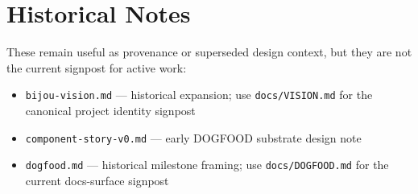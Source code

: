 \section{Historical Notes}\label{record-030-historical-notes}

These remain useful as provenance or superseded design context, but they are not the current signpost for active work:

\begin{itemize}
\tightlist
\item
  \texttt{b\allowbreak{}i\allowbreak{}j\allowbreak{}o\allowbreak{}u\allowbreak{}-\allowbreak{}v\allowbreak{}i\allowbreak{}s\allowbreak{}i\allowbreak{}o\allowbreak{}n\allowbreak{}.\allowbreak{}m\allowbreak{}d} --- historical expansion; use \texttt{d\allowbreak{}o\allowbreak{}c\allowbreak{}s\allowbreak{}/\allowbreak{}V\allowbreak{}I\allowbreak{}S\allowbreak{}I\allowbreak{}O\allowbreak{}N\allowbreak{}.\allowbreak{}m\allowbreak{}d} for the canonical project identity signpost
\item
  \texttt{c\allowbreak{}o\allowbreak{}m\allowbreak{}p\allowbreak{}o\allowbreak{}n\allowbreak{}e\allowbreak{}n\allowbreak{}t\allowbreak{}-\allowbreak{}s\allowbreak{}t\allowbreak{}o\allowbreak{}r\allowbreak{}y\allowbreak{}-\allowbreak{}v\allowbreak{}0\allowbreak{}.\allowbreak{}m\allowbreak{}d} --- early DOGFOOD substrate design note
\item
  \texttt{d\allowbreak{}o\allowbreak{}g\allowbreak{}f\allowbreak{}o\allowbreak{}o\allowbreak{}d\allowbreak{}.\allowbreak{}m\allowbreak{}d} --- historical milestone framing; use \texttt{d\allowbreak{}o\allowbreak{}c\allowbreak{}s\allowbreak{}/\allowbreak{}D\allowbreak{}O\allowbreak{}G\allowbreak{}F\allowbreak{}O\allowbreak{}O\allowbreak{}D\allowbreak{}.\allowbreak{}m\allowbreak{}d} for the current docs-surface signpost
\end{itemize}

